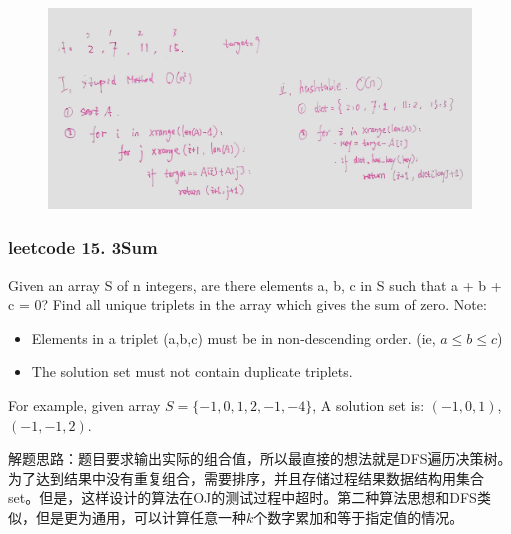\documentclass[a4paper,10pt]{article}
\begin{document}
\begin{figure}[h]
    \includegraphics[width=\textwidth]{leetcode1.jpg}
    \centering \\
\end{figure}


\subsubsection{leetcode 15. 3Sum}
Given an array S of n integers, are there elements a, b, c in S such that a + b + c = 0? Find all unique triplets in the array which gives the sum of zero. Note:
\begin{itemize}
    \item Elements in a triplet (a,b,c) must be in non-descending order. (ie, $a\leq b\leq c$)
    \item The solution set must not contain duplicate triplets.
\end{itemize}

\noindent For example, given array $S = \{-1,0,1,2,-1,-4\}$, A solution set is: $(-1, 0, 1)$, $(-1, -1, 2)$. \\
    
\begin{CJK*}{UTF8}{gbsn}
\noindent 解题思路：题目要求输出实际的组合值，所以最直接的想法就是DFS遍历决策树。为了达到结果中没有重复组合，需要排序，并且存储过程结果数据结构用集合set。但是，这样设计的算法在OJ的测试过程中超时。第二种算法思想和DFS类似，但是更为通用，可以计算任意一种$k$个数字累加和等于指定值的情况。
\end{CJK*}
\end{document}
